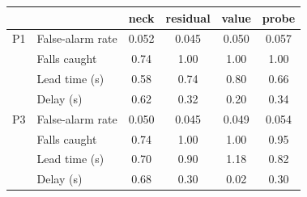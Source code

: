 \begin{tabular}{@{}llcccc@{}}
\toprule
 & & neck & residual & value & probe\\
\midrule
P1 & False-alarm rate & 0.052 & 0.045 & 0.050 & 0.057\\
 & Falls caught & 0.74 & 1.00 & 1.00 & 1.00\\
 & Lead time (s) & 0.58 & 0.74 & 0.80 & 0.66\\
 & Delay (s) & 0.62 & 0.32 & 0.20 & 0.34\\
\midrule
P3 & False-alarm rate & 0.050 & 0.045 & 0.049 & 0.054\\
 & Falls caught & 0.74 & 1.00 & 1.00 & 0.95\\
 & Lead time (s) & 0.70 & 0.90 & 1.18 & 0.82\\
 & Delay (s) & 0.68 & 0.30 & 0.02 & 0.30\\
\bottomrule
\end{tabular}

